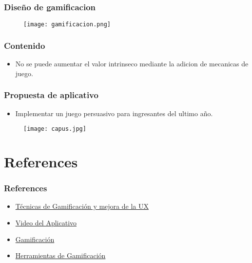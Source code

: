 \documentclass[11pt]{beamer}
\begin{document}
\begin{frame}
\frametitle{Diseño de gamificacion}
\begin{itemize}
    \begin{figure}
        \texttt{[image: gamificacion.png]}
        \label{fig:my_label}
    \end{figure}
\end{itemize}
\end{frame}



\begin{frame}
\frametitle{Contenido}
\begin{itemize}
    \item No se puede aumentar el valor intrinseco mediante la adicion de mecanicas de juego.
\end{itemize}
\end{frame}

\begin{frame}
\frametitle{Propuesta de aplicativo}
\begin{itemize}
    \item Implementar un juego persuasivo para ingresantes del ultimo año.
\end{itemize}
\begin{figure}
        \texttt{[image: capus.jpg]}
        \label{fig:my_label}
    \end{figure}
\end{frame}



\section{References}
\begin{frame}
\frametitle{References}
\begin{itemize}
\item \href{https://www.youtube.com/watch?v=v23kdMadKQA}{Técnicas de Gamificación y mejora de la UX}
\item \href {https://youtu.be/evSQ3Lzw6eg}{Video del Aplicativo }
\item \href {https://www.educaciontrespuntocero.com/noticias/gamificacion-que-es-objetivos/}{Gamificación}
\item \href {https://docs.google.com/presentation/d/1kithbacPQYbR3hcHVanO_Qqp17kC4xdvGiT8p82FSwE/edit#slide=id.p}{Herramientas de Gamificación}
\end{itemize}
\end{frame}
\end{document}
